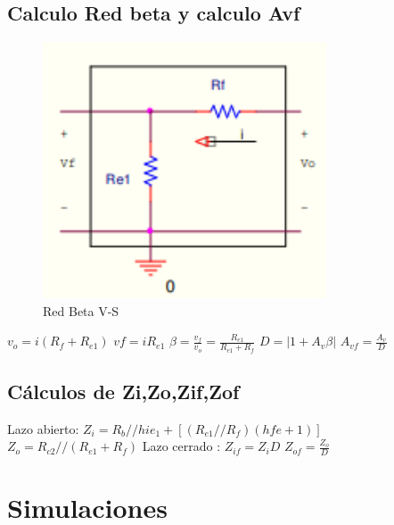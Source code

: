 \documentclass[12pt, letterpaper]{article}
\begin{document}
\subsection{Calculo Red beta y calculo Avf}
\begin{figure}[h]
    \centering
    \includegraphics[width=0.75\textwidth]{Imagenes/Screenshot_58.png}
    \caption{Red Beta  V-S}
    \label{fig:2.2.1}
\end{figure}
\singlespacing
$v_o=i(R_f+R_{e1})$ \hspace{1cm} $vf=iR_{e1}$
\singlespacing
$\beta = \frac{v_f}{v_o}=\frac{R_{e1}}{R_{e1}+R_f}$
\singlespacing
$D=|1+A_v\beta|$ \hspace{1cm} $A_{vf}=\frac{A_v}{D}$
\subsection{Cálculos de Zi,Zo,Zif,Zof}
Lazo abierto:
$Z_i=R_b//{hie_1+[(R_{e1}//R_f)(hfe+1)]}$
\singlespacing
$Z_o=R_{c2}//(R_{e1}+R_f)$
\singlespacing
Lazo cerrado :
$Z_{if}=Z_iD$
\singlespacing
$Z_{of}=\frac{Z_o}{D}$

\section{Simulaciones}
\end{document}

